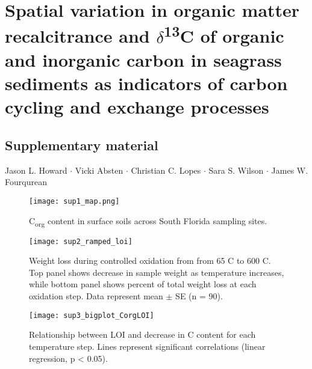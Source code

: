 \section*{Spatial variation in organic matter recalcitrance and $\delta$\textsuperscript{13}C of organic and inorganic carbon in seagrass sediments as indicators of carbon cycling and exchange processes}


\subsection*{Supplementary material \bigskip}
Jason L. Howard $\cdot$ Vicki Absten $\cdot$ Christian C. Lopes $\cdot$ Sara S. Wilson $\cdot$ James W. Fourqurean



\bigskip
\bigskip

\begin{figure}[h]
  \centering
   \texttt{[image: sup1\_map.png]}
\caption{C\textsubscript{org} content in surface soils across South Florida sampling sites.}
  \label{Online Resource:2F0}
\end{figure}


\begin{figure}[h]
  \centering
   \texttt{[image: sup2\_ramped\_loi]}
\caption{Weight loss during controlled oxidation from from 65 \textdegree C to 600 \textdegree C. Top panel shows decrease in sample weight as temperature increases, while bottom panel shows percent of total weight loss at each oxidation step. Data represent mean $\pm$ SE (n = 90).}
  \label{Online Resource:2F1}
\end{figure}



\begin{figure}[h]
  \centering
  \texttt{[image: sup3\_bigplot\_CorgLOI]}
\caption{Relationship between LOI and decrease in C content for each temperature step. Lines represent significant correlations (linear regression, p < 0.05).}
  \label{fig:2F2}
\end{figure}

\clearpage







